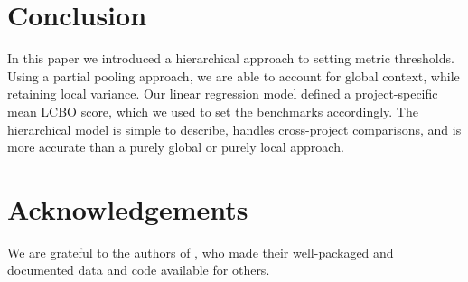 \documentclass[sigconf,natbib=false]{acmart}
\begin{document}

\section{Conclusion}
In this paper we introduced a hierarchical approach to setting metric
thresholds. Using a partial pooling approach, we are able to account for global
context, while retaining local variance. Our linear regression model defined a
project-specific mean LCBO score, which we used to set the benchmarks
accordingly. The hierarchical model is simple to describe, handles cross-project
comparisons, and is more accurate than a purely global or purely local approach.

\section{Acknowledgements}
We are grateful to the authors of \cite{Aniche2016}, who made their
well-packaged and documented data and code available for others.
 
\newpage
 \printbibliography 
\end{document}
